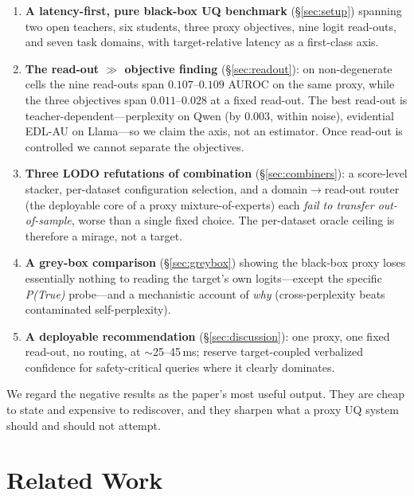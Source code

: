 \documentclass[11pt]{article}
\begin{document}
\begin{enumerate}[leftmargin=1.4em,itemsep=1pt,topsep=2pt]
\item \textbf{A latency-first, pure black-box UQ benchmark} (\S\ref{sec:setup})
spanning two open teachers, six students, three proxy objectives, nine logit
read-outs, and seven task domains, with target-relative latency as a first-class axis.
\item \textbf{The read-out $\gg$ objective finding} (\S\ref{sec:readout}): on
non-degenerate cells the nine read-outs span $0.107$--$0.109$ AUROC on the same proxy, while
the three objectives span $0.011$--$0.028$ at a fixed read-out. The best read-out is
teacher-dependent---perplexity on Qwen (by $0.003$, within noise), evidential EDL-AU on
Llama---so we claim the axis, not an estimator. Once read-out is controlled we cannot
separate the objectives.
\item \textbf{Three LODO refutations of combination} (\S\ref{sec:combiners}): a
score-level stacker, per-dataset configuration selection, and a
domain$\rightarrow$read-out router (the deployable core of a proxy mixture-of-experts)
each \emph{fail to transfer out-of-sample}, worse than a single fixed choice. The
per-dataset oracle ceiling is therefore a mirage, not a target.
\item \textbf{A grey-box comparison} (\S\ref{sec:greybox}) showing the black-box proxy
loses essentially nothing to reading the target's own logits---except the specific
\emph{P(True)} probe---and a mechanistic account of \emph{why} (cross-perplexity beats
contaminated self-perplexity).
\item \textbf{A deployable recommendation} (\S\ref{sec:discussion}): one proxy,
one fixed read-out, no routing, at $\sim$25--45\,ms; reserve target-coupled verbalized
confidence for safety-critical queries where it clearly dominates.
\end{enumerate}

We regard the negative results as the paper's most useful output. They are cheap to
state and expensive to rediscover, and they sharpen what a proxy UQ system should and
should not attempt.

\section{Related Work}
\end{document}
